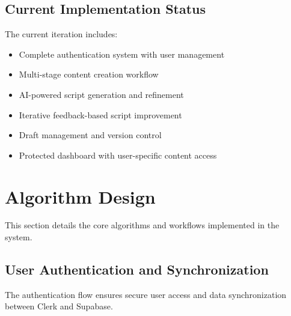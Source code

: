 \subsection{Current Implementation Status}

The current iteration includes:
\begin{itemize}
    \item Complete authentication system with user management
    \item Multi-stage content creation workflow
    \item AI-powered script generation and refinement
    \item Iterative feedback-based script improvement
    \item Draft management and version control
    \item Protected dashboard with user-specific content access
\end{itemize}


\section{Algorithm Design}

This section details the core algorithms and workflows implemented in the system.

\subsection{User Authentication and Synchronization}

The authentication flow ensures secure user access and data synchronization between Clerk and Supabase.

